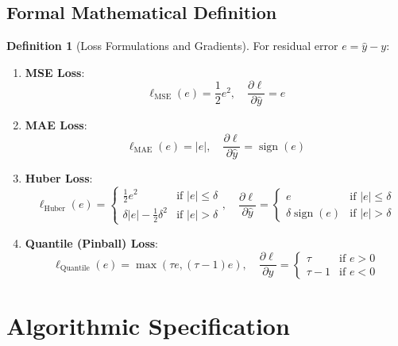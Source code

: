 \documentclass[11pt,a4paper]{article}
\theoremstyle{definition}
\newtheorem{definition}{Definition}[section]
\begin{document}
\subsection{Formal Mathematical Definition}
\begin{definition}[Loss Formulations and Gradients]
For residual error $e = \hat{y} - y$:
\begin{enumerate}
    \item \textbf{MSE Loss}:
    \begin{equation}
    \ell_{\text{MSE}}(e) = \frac{1}{2} e^2, \quad \frac{\partial \ell}{\partial \hat{y}} = e \label{eq:mse_def}
    \end{equation}
    \item \textbf{MAE Loss}:
    \begin{equation}
    \ell_{\text{MAE}}(e) = |e|, \quad \frac{\partial \ell}{\partial \hat{y}} = \operatorname{sign}(e) \label{eq:mae_def}
    \end{equation}
    \item \textbf{Huber Loss}:
    \begin{equation}
    \ell_{\text{Huber}}(e) = \begin{cases} \frac{1}{2} e^2 & \text{if } |e| \le \delta \\ \delta |e| - \frac{1}{2} \delta^2 & \text{if } |e| > \delta \end{cases}, \quad \frac{\partial \ell}{\partial \hat{y}} = \begin{cases} e & \text{if } |e| \le \delta \\ \delta \operatorname{sign}(e) & \text{if } |e| > \delta \end{cases} \label{eq:huber_def}
    \end{equation}
    \item \textbf{Quantile (Pinball) Loss}:
    \begin{equation}
    \ell_{\text{Quantile}}(e) = \max(\tau e, (\tau - 1) e), \quad \frac{\partial \ell}{\partial \hat{y}} = \begin{cases} \tau & \text{if } e > 0 \\ \tau - 1 & \text{if } e < 0 \end{cases} \label{eq:quantile_def}
    \end{equation}
\end{enumerate}
\end{definition}

\section{Algorithmic Specification}
\end{document}
